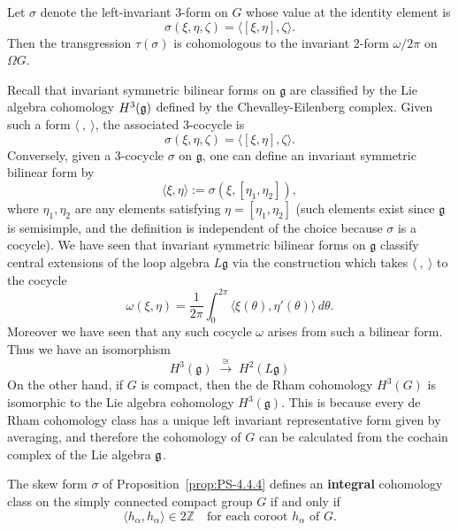 \documentclass[12pt]{article}
\begin{document}
\begin{proposition}\label{prop:PS-4.4.4}
    Let $\sigma$ denote the left-invariant 3-form on $G$ whose value at the identity element is
    \[
        \sigma(\xi,\eta,\zeta) = \langle [\xi,\eta], \zeta\rangle.
    \]
    Then the transgression $\tau(\sigma)$ is cohomologous to the invariant 2-form $\omega/2\pi$ on $\Omega G$.
\end{proposition}

\begin{remark}
     Recall that invariant symmetric bilinear forms on $\mathfrak g$ are classified by the Lie algebra cohomology $H^3(\mathfrak{g})$ defined by the Chevalley-Eilenberg complex. Given such a form $\langle\ ,\ \rangle$, the associated 3-cocycle is
    \[    \sigma(\xi,\eta,\zeta) = \langle [\xi,\eta], \zeta\rangle. \]
    Conversely, given a 3-cocycle $\sigma$ on $\mathfrak g$, one can define an invariant symmetric bilinear form by
    \[    \langle \xi,\eta\rangle := \sigma(\xi,[\eta_1,\eta_2]), \]
    where $\eta_1,\eta_2$ are any elements satisfying $\eta=[\eta_1,\eta_2]$ (such elements exist since $\mathfrak g$ is semisimple, and the definition is independent of the choice because $\sigma$ is a cocycle). We have seen that invariant symmetric bilinear forms on $\mathfrak g$ classify central extensions of the loop algebra $L\mathfrak g$ via the construction which takes $\langle\ ,\ \rangle$ to the cocycle
    \[
        \omega(\xi,\eta) = \frac{1}{2\pi} \int_0^{2\pi} \langle \xi(\theta), \eta'(\theta)\rangle\,d\theta.
    \] Moreover we have seen that any such cocycle $\omega$ arises from such a bilinear form. Thus we have an isomorphism 
    \[
        H^3(\mathfrak g) \;\xrightarrow{\cong}\; H^2(L\mathfrak g)
    \]
    On the other hand, if $G$ is compact, then the de Rham cohomology $H^3(G)$ is isomorphic to the Lie algebra cohomology $H^3(\mathfrak g)$. This is because every de Rham cohomology class has a unique left invariant representative form given by averaging, and therefore the cohomology of $G$ can be calculated from the cochain complex of the Lie algebra $\mathfrak{g}$.
\end{remark}

\begin{proposition}\label{prop:PS-4.4.5}
    The skew form $\sigma$ of Proposition~\ref{prop:PS-4.4.4} defines an \textbf{integral} cohomology class on the simply connected compact group $G$ if and only if
    \[
        \langle h_\alpha, h_\alpha\rangle \in 2\mathbb{Z}\quad\text{for each coroot } h_\alpha\text{ of } G.
    \]
\end{proposition}
\end{document}
